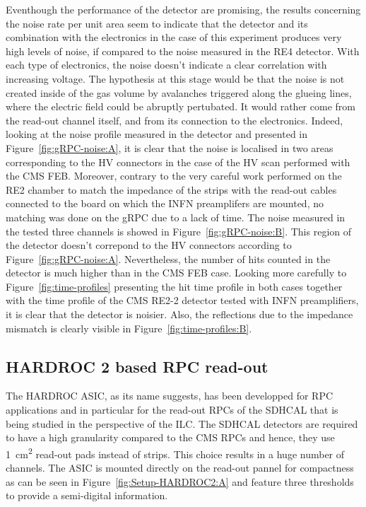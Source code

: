     Eventhough the performance of the detector are promising, the results concerning the noise rate per unit area seem to indicate that the detector and its combination with the electronics in the case of this experiment produces very high levels of noise, if compared to the noise measured in the RE4 detector. With each type of electronics, the noise doesn't indicate a clear correlation with increasing voltage. The hypothesis at this stage would be that the noise is not created inside of the gas volume by avalanches triggered along the glueing lines, where the electric field could be abruptly pertubated. It would rather come from the read-out channel itself, and from its connection to the electronics. Indeed, looking at the noise profile measured in the detector and presented in Figure~\ref{fig:gRPC-noise:A}, it is clear that the noise is localised in two areas corresponding to the HV connectors in the case of the HV scan performed with the CMS FEB. Moreover, contrary to the very careful work performed on the RE2 chamber to match the impedance of the strips with the read-out cables connected to the board on which the INFN preamplifers are mounted, no matching was done on the gRPC due to a lack of time. The noise measured in the tested three channels is showed in Figure~\ref{fig:gRPC-noise:B}. This region of the detector doesn't correpond to the HV connectors according to Figure~\ref{fig:gRPC-noise:A}. Nevertheless, the number of hits counted in the detector is much higher than in the CMS FEB case. Looking more carefully to Figure~\ref{fig:time-profiles} presenting the hit time profile in both cases together with the time profile of the CMS RE2-2 detector tested with INFN preamplifiers, it is clear that the detector is noisier. Also, the reflections due to the impedance mismatch is clearly visible in Figure~\ref{fig:time-profiles:B}.

	\subsection{HARDROC 2 based RPC read-out}
	\label{chapt6:ssec:HARDROC2}
	
	The \acf{HARDROC} ASIC, as its name suggests, has been developped for RPC applications and in particular for the read-out RPCs of the SDHCAL that is being studied in the perspective of the \acf{ILC}. The SDHCAL detectors are required to have a high granularity compared to the CMS RPCs and hence, they use \SI{1}{cm^2} read-out pads instead of strips. This choice results in a huge number of channels. The ASIC is mounted directly on the read-out pannel for compactness as can be seen in Figure~\ref{fig:Setup-HARDROC2:A} and feature three thresholds to provide a semi-digital information.
	 
